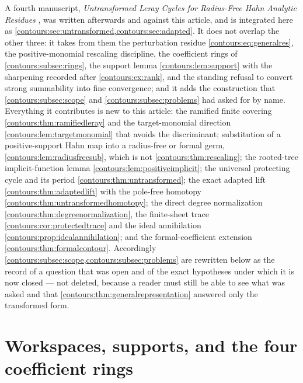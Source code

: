 \documentclass[11pt,letterpaper]{article}
\theoremstyle{definition}
\theoremstyle{remark}
\numberwithin{equation}{section}
\begin{document}
A fourth manuscript, \emph{Untransformed Leray Cycles for Radius-Free Hahn
Analytic Residues} \cite{Leray}, was written afterwards and against this
article, and is integrated here as
\cref{contours:sec:untransformed,contours:sec:adapted}. It
does not overlap the other three: it takes from them the perturbation residue
\eqref{contours:eq:generalres}, the positive-monomial rescaling discipline, the
coefficient rings of \cref{contours:subsec:rings}, the support lemma
\cref{contours:lem:support} with the sharpening recorded after
\cref{contours:ex:rank}, and the standing refusal to convert strong summability
into fine convergence; and it adds the construction that
\cref{contours:subsec:scope} and \cref{contours:subsec:problems} had asked for
by name. Everything it contributes is new to this article: the ramified finite
covering \cref{contours:thm:ramifiedleray} and the target-monomial direction
\cref{contours:lem:targetmonomial} that avoids the discriminant; substitution of
a positive-support Hahn map into a radius-free or formal germ,
\cref{contours:lem:radiusfreesub}, which is not
\cref{contours:thm:rescaling}; the rooted-tree implicit-function lemma
\cref{contours:lem:positiveimplicit}; the universal protecting cycle and its
period \cref{contours:thm:untransformed}; the exact adapted lift
\cref{contours:thm:adaptedlift} with the pole-free homotopy
\cref{contours:thm:untransformedhomotopy}; the direct degree normalization
\cref{contours:thm:degreenormalization}, the finite-sheet trace
\cref{contours:cor:protectedtrace} and the ideal annihilation
\cref{contours:prop:idealannihilation}; and the formal-coefficient extension
\cref{contours:thm:formalcontour}. Accordingly
\cref{contours:subsec:scope,contours:subsec:problems} are rewritten below as the
record of a question that was open and of the exact hypotheses under which it is
now closed --- not deleted, because a reader must still be able to see what was
asked and that \cref{contours:thm:generalrepresentation} answered only the
transformed form.

\section{Workspaces, supports, and the four coefficient rings}
\label{contours:sec:foundations}
\end{document}
